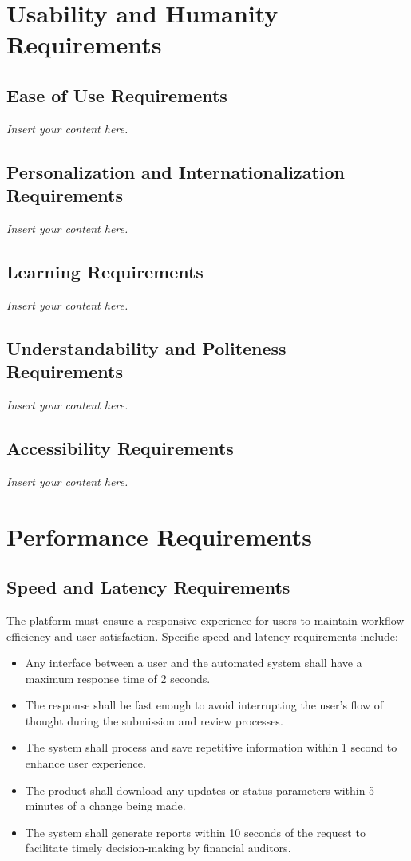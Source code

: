 \documentclass[12pt]{article}
\newcommand{\lips}{\textit{Insert your content here.}}
\begin{document}
\section{Usability and Humanity Requirements}
\subsection{Ease of Use Requirements}
\lips
\subsection{Personalization and Internationalization Requirements}
\lips
\subsection{Learning Requirements}
\lips
\subsection{Understandability and Politeness Requirements}
\lips
\subsection{Accessibility Requirements}
\lips

\section{Performance Requirements}

\subsection{Speed and Latency Requirements}
The platform must ensure a responsive experience for users to maintain workflow efficiency and user satisfaction. Specific speed and latency requirements include:

\begin{itemize}
    \item Any interface between a user and the automated system shall have a maximum response time of 2 seconds.
    \item The response shall be fast enough to avoid interrupting the user’s flow of thought during the submission and review processes.
    \item The system shall process and save repetitive information within 1 second to enhance user experience.
    \item The product shall download any updates or status parameters within 5 minutes of a change being made.
    \item The system shall generate reports within 10 seconds of the request to facilitate timely decision-making by financial auditors.
\end{itemize}
\end{document}
